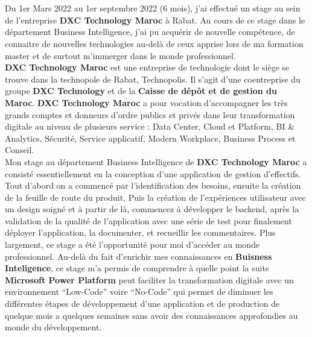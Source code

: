 \titlespacing*{\chapter}{0pt}{0in}{0.3in}
\chapter*{}
\titlespacing*{\chapter}{0pt}{0.45in}{0.3in}%

Du 1er Mars 2022 au 1er septembre 2022 (6 mois), j’ai effectué un stage au sein de l’entreprise \textbf{DXC Technology Maroc} à Rabat. Au cours de ce stage dans le département Business Intelligence, j'ai pu acquérir de nouvelle compétence, de connaitre de nouvelles technologies au-delà de ceux apprise lors de ma formation master et de surtout m'immerger dans le monde professionnel. \\ 

\textbf{DXC Technology Maroc} est une entreprise de technologie dont le siège se trouve dans la technopole de Rabat, Technopolis. Il s’agit d’une coentreprise du groupe \textbf{DXC Technology} et de la \textbf{Caisse de dépôt et de gestion du Maroc}. \textbf{DXC Technology Maroc} a pour vocation d'accompagner les très grands comptes et donneurs d'ordre publics et privés dans leur transformation digitale au niveau de plusieurs service : Data Center, Cloud et Platform, BI & Analytics, Sécurité, Service applicatif, Modern Workplace, Business Process et Conseil.\\ 

Mon stage au département Business Intelligence de \textbf{DXC Technology Maroc} a consisté essentiellement en la conception d'une application de gestion d'effectifs. Tout d'abord on a commencé par l'identification des besoins, ensuite la création de la feuille de route du produit, Puis la création de l'expériences utilisateur avec un design soigné et à partir de là, commencez à développer le backend, après la validation de la qualité de l'application avec une série de test pour finalement déployer l'application, la documenter, et recueillir les commentaires. Plus largement, ce stage a été l’opportunité pour moi d'accéder au monde professionnel. Au-delà du fait d’enrichir mes connaissances en \textbf{Buisness Inteligence}, ce stage m’a permis de comprendre à quelle point la suite \textbf{Microsoft Power Platform} peut faciliter la transformation digitale avec un environnement “Low-Code” voire “No-Code” qui permet de diminuer les différentes étapes de développement d'une application et de production de quelque mois a quelques semaines sans avoir des connaissances approfondies au monde du développement.\\

